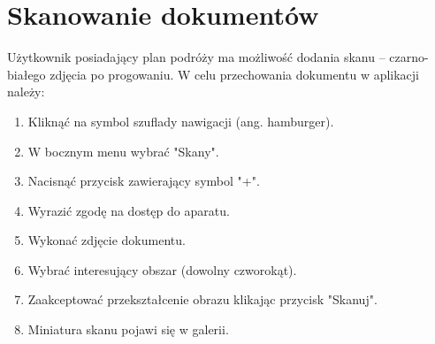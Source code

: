 \documentclass[10pt,twoside,a4paper]{report}
\begin{document}
\section{Skanowanie dokumentów}
Użytkownik posiadający plan podróży ma możliwość dodania skanu – czarno-białego zdjęcia po progowaniu.
W celu przechowania dokumentu w aplikacji należy:
\begin{enumerate}
\item Kliknąć na symbol szuflady nawigacji (ang. hamburger).
\item W bocznym menu wybrać "Skany".
\item Nacisnąć przycisk zawierający symbol "+".
\item Wyrazić zgodę na dostęp do aparatu.
\item Wykonać zdjęcie dokumentu.
\item Wybrać interesujący obszar (dowolny czworokąt).
\item Zaakceptować przekształcenie obrazu klikając przycisk "Skanuj".
\item Miniatura skanu pojawi się w galerii.
\end{enumerate}
\end{document}
